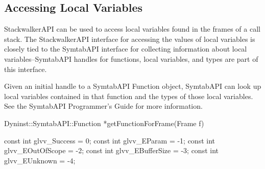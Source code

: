 


\subsection{Accessing Local Variables}
	
StackwalkerAPI can be used to access local variables found in the frames of a
call stack. The StackwalkerAPI interface for accessing the values of local
variables is closely tied to the SymtabAPI interface for collecting information
about local variables--SymtabAPI handles for functions, local variables, and
types are part of this interface. 

Given an initial handle to a SymtabAPI Function object, SymtabAPI can look up
local variables contained in that function and the types of those local
variables. See the SymtabAPI Programmer's Guide for more information.

\begin{apient}
Dyninst::SymtabAPI::Function *getFunctionForFrame(Frame f)
\end{apient}

\begin{apient}
const int glvv_Success = 0;
const int glvv_EParam = -1;
const int glvv_EOutOfScope = -2;
const int glvv_EBufferSize = -3;
const int glvv_EUnknown = -4;
\end{apient}

